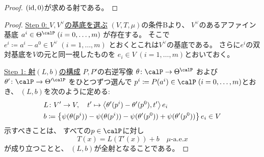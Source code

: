 \documentclass[report]{jlreq}
\begin{document}

\begin{proof}
    $(\mathrm{id}, 0)$が求める射である。
\end{proof}


\begin{proof}
    \uline{Step 0: $V, V^\vee$の基底を選ぶ} \quad
    $(V, T, \mu)$の条件Bより、
    $V^\vee$のあるアファイン基底
    $a^i \in \Theta^\calP \; (i = 0, \dots, m)$
    が存在する。
    そこで
    $e^i \coloneqq a^i - a^0 \in V^\vee \; (i = 1, \dots, m)$
    とおくとこれは$V^\vee$の基底である。
    さらに$e^i$の双対基底を$V$の元と同一視したものを
    $e_i \in V \; (i = 1, \dots, m)$とおいておく。

    \uline{Step 1: 射$(L, b)$の構成} \quad
    $P, P'$の右逆写像
    $\theta \colon \calP \to \Theta^\calP$
    および
    $\theta' \colon \calP \to \Theta'^\calP$
    をひとつずつ選んで
    $p^i \coloneqq P(a^i) \in \calP \; (i = 0, \dots, m)$とおき、
    $(L, b)$を次のように定める:
    \begin{alignat}{1}
        &L \colon V' \to V,
            \quad
            t' \mapsto
                \left\langle{\theta'(p^i) - \theta'(p^0)},{t'}\right\rangle e_i
            \\
        &b \coloneqq
            \left\{{
                \psi(\theta(p^i)) - \psi(\theta(p^i))
                - \psi(\theta'(p^0)) + \psi(\theta'(p^0))
            }\right\} e_i
            \in V
    \end{alignat}
    示すべきことは、
    すべての$p \in \calP$に対し
    \begin{equation}
        T(x) = L(T'(x)) + b
            \quad
            \text{$\mu$-a.e.$x$}
    \end{equation}
    が成り立つことと、
    $(L, b)$が全射となることである。


\end{proof}
\end{document}

